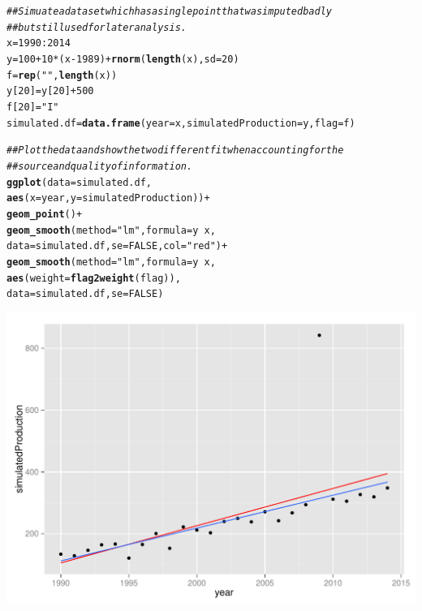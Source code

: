 \documentclass[nojss]{jss}\usepackage[]{graphicx}\usepackage[]{color}
\makeatletter
\def\maxwidth{ %
  \ifdim\Gin@nat@width>\linewidth
    \linewidth
  \else
    \Gin@nat@width
  \fi
}
\newcommand{\hlnum}[1]{\textcolor[rgb]{0.686,0.059,0.569}{#1}}%
\newcommand{\hlstr}[1]{\textcolor[rgb]{0.192,0.494,0.8}{#1}}%
\newcommand{\hlcom}[1]{\textcolor[rgb]{0.678,0.584,0.686}{\textit{#1}}}%
\newcommand{\hlopt}[1]{\textcolor[rgb]{0,0,0}{#1}}%
\newcommand{\hlstd}[1]{\textcolor[rgb]{0.345,0.345,0.345}{#1}}%
\newcommand{\hlkwb}[1]{\textcolor[rgb]{0.69,0.353,0.396}{#1}}%
\newcommand{\hlkwc}[1]{\textcolor[rgb]{0.333,0.667,0.333}{#1}}%
\newcommand{\hlkwd}[1]{\textcolor[rgb]{0.737,0.353,0.396}{\textbf{#1}}}%
\newenvironment{kframe}{%
 \def\at@end@of@kframe{}%
 \ifinner\ifhmode%
  \def\at@end@of@kframe{\end{minipage}}%
  \begin{minipage}{\columnwidth}%
 \fi\fi%
 \def\FrameCommand##1{\hskip\@totalleftmargin \hskip-\fboxsep
 \colorbox{shadecolor}{##1}\hskip-\fboxsep
     \hskip-\linewidth \hskip-\@totalleftmargin \hskip\columnwidth}%
 \MakeFramed {\advance\hsize-\width
   \@totalleftmargin\z@ \linewidth\hsize
   \@setminipage}}%
 {\par\unskip\endMakeFramed%
 \at@end@of@kframe}
\newenvironment{knitrout}{}{} %
\makeatother
\begin{document}
\begin{knitrout}
\color{fgcolor}\begin{kframe}
\begin{alltt}
\hlcom{## Simuate a data set which has a single point that was imputed badly }
\hlcom{## but still used for later analysis.}
\hlstd{x} \hlkwb{=} \hlnum{1990}\hlopt{:}\hlnum{2014}
\hlstd{y} \hlkwb{=} \hlnum{100} \hlopt{+} \hlnum{10} \hlopt{*} \hlstd{(x} \hlopt{-} \hlnum{1989}\hlstd{)} \hlopt{+} \hlkwd{rnorm}\hlstd{(}\hlkwd{length}\hlstd{(x),} \hlkwc{sd} \hlstd{=} \hlnum{20}\hlstd{)}
\hlstd{f} \hlkwb{=} \hlkwd{rep}\hlstd{(}\hlstr{""}\hlstd{,} \hlkwd{length}\hlstd{(x))}
\hlstd{y[}\hlnum{20}\hlstd{]} \hlkwb{=} \hlstd{y[}\hlnum{20}\hlstd{]} \hlopt{+} \hlnum{500}
\hlstd{f[}\hlnum{20}\hlstd{]} \hlkwb{=} \hlstr{"I"}
\hlstd{simulated.df} \hlkwb{=} \hlkwd{data.frame}\hlstd{(}\hlkwc{year} \hlstd{= x,} \hlkwc{simulatedProduction} \hlstd{= y,} \hlkwc{flag} \hlstd{= f)}

\hlcom{## Plot the data and show the two different fit when accounting for the }
\hlcom{## source and quality of information.}
\hlkwd{ggplot}\hlstd{(}\hlkwc{data} \hlstd{= simulated.df,}
       \hlkwd{aes}\hlstd{(}\hlkwc{x} \hlstd{= year,} \hlkwc{y} \hlstd{= simulatedProduction))} \hlopt{+}
    \hlkwd{geom_point}\hlstd{()} \hlopt{+}
    \hlkwd{geom_smooth}\hlstd{(}\hlkwc{method} \hlstd{=} \hlstr{"lm"}\hlstd{,} \hlkwc{formula} \hlstd{= y} \hlopt{~} \hlstd{x,}
                \hlkwc{data} \hlstd{= simulated.df,} \hlkwc{se} \hlstd{=} \hlnum{FALSE}\hlstd{,} \hlkwc{col} \hlstd{=} \hlstr{"red"}\hlstd{)} \hlopt{+}
    \hlkwd{geom_smooth}\hlstd{(}\hlkwc{method} \hlstd{=} \hlstr{"lm"}\hlstd{,} \hlkwc{formula} \hlstd{= y} \hlopt{~} \hlstd{x,}
                \hlkwd{aes}\hlstd{(}\hlkwc{weight} \hlstd{=} \hlkwd{flag2weight}\hlstd{(flag)),}
                \hlkwc{data} \hlstd{= simulated.df,} \hlkwc{se} \hlstd{=} \hlnum{FALSE}\hlstd{)}
\end{alltt}
\end{kframe}

{\centering \includegraphics[width=\maxwidth]{figure/simulated-example} 

}



\end{knitrout}
\end{document}
